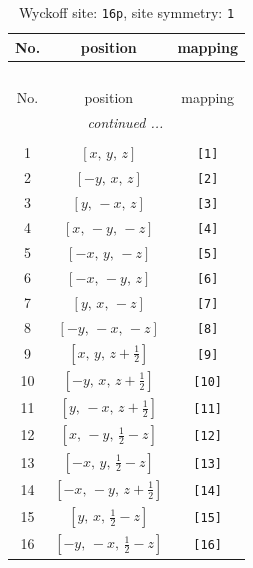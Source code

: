 \documentclass[fleqn,8pt]{jsarticle}
\begin{document}
\begin{longtable}{ccc}
\caption{Wyckoff site: {\tt 16p}, site symmetry: {\tt 1}}
 \\
 \hline \hline
No. & position & mapping \\ \hline \endfirsthead

\multicolumn{2}{l}{\tablename\ \thetable{}} \\
 \hline \hline
No. & position & mapping \\ \hline \endhead

 \hline \hline
\multicolumn{2}{r}{\footnotesize\it continued ...} \\ \endfoot

 \hline \hline
\multicolumn{2}{r}{} \\ \endlastfoot

1 & $\left[ x,\, y,\, z \right]$ & {\tt [1]} \\ \hline
2 & $\left[ - y,\, x,\, z \right]$ & {\tt [2]} \\ \hline
3 & $\left[ y,\, - x,\, z \right]$ & {\tt [3]} \\ \hline
4 & $\left[ x,\, - y,\, - z \right]$ & {\tt [4]} \\ \hline
5 & $\left[ - x,\, y,\, - z \right]$ & {\tt [5]} \\ \hline
6 & $\left[ - x,\, - y,\, z \right]$ & {\tt [6]} \\ \hline
7 & $\left[ y,\, x,\, - z \right]$ & {\tt [7]} \\ \hline
8 & $\left[ - y,\, - x,\, - z \right]$ & {\tt [8]} \\ \hline
9 & $\left[ x,\, y,\, z + \frac{1}{2} \right]$ & {\tt [9]} \\ \hline
10 & $\left[ - y,\, x,\, z + \frac{1}{2} \right]$ & {\tt [10]} \\ \hline
11 & $\left[ y,\, - x,\, z + \frac{1}{2} \right]$ & {\tt [11]} \\ \hline
12 & $\left[ x,\, - y,\, \frac{1}{2} - z \right]$ & {\tt [12]} \\ \hline
13 & $\left[ - x,\, y,\, \frac{1}{2} - z \right]$ & {\tt [13]} \\ \hline
14 & $\left[ - x,\, - y,\, z + \frac{1}{2} \right]$ & {\tt [14]} \\ \hline
15 & $\left[ y,\, x,\, \frac{1}{2} - z \right]$ & {\tt [15]} \\ \hline
16 & $\left[ - y,\, - x,\, \frac{1}{2} - z \right]$ & {\tt [16]} \\
\end{longtable}
\end{document}

